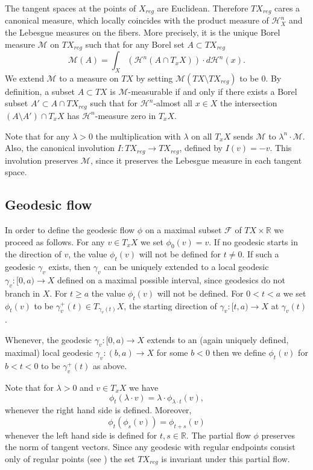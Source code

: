 \documentclass[12pt,leqno,intlimits]{amsart}
\numberwithin{equation}{section}
\theoremstyle{definition}
\theoremstyle{remark}
\newcommand{\R}{\mathbb{R}}
\def\:{\colon}
\begin{document}
The tangent spaces at the points of $X_{reg}$ are Euclidean.
Therefore $TX_{reg}$ cares a canonical measure, which locally coincides with the product measure of $\mathcal H^n _X$ and the Lebesgue measures on the fibers. 
More precisely, it is the unique Borel measure $\mathcal M$ on $TX_{reg}$ such that for any  Borel set $A\subset TX_{reg}$
$$\mathcal M(A)= \int _X (\mathcal H^n(A \cap T_x X))\cdot d\mathcal H^n (x).$$
 We extend $\mathcal M$ to a measure on $TX$ by setting $\mathcal M(TX\setminus TX_{reg})$ to be $0$.
By definition, a subset $A\subset TX$ is $\mathcal M$-measurable if and only if there exists  a Borel subset $A'\subset A\cap TX_{reg}$ such that
for $\mathcal H^n$-almost all $x\in X$ the intersection $(A\setminus A') \cap T_xX$ has $\mathcal H^n$-measure zero in $T_xX$.

Note that for any $\lambda >0$ the multiplication with $\lambda$  on all $T_xX$ sends $\mathcal M $ to $\lambda ^n \cdot \mathcal M$.
Also, the canonical involution $I\:TX_{reg}\to TX_{reg}$, defined by $I(v)=-v$.
This involution preserves $\mathcal M$, since it preserves the Lebesgue measure in each tangent space.


\subsection{Geodesic flow}
In order to define the geodesic flow $\phi$ on a maximal subset   $\mathcal F$ of $TX \times \R $  we proceed as follows.
For any  $v\in  T_xX$ we set $\phi_0(v)=v$.
If no geodesic starts in the direction of $v$, the value $\phi_t(v)$ will not be defined for $t\neq 0$. If such a geodesic $\gamma_v$ exists, then $\gamma_v$   can be uniquely extended to a  local geodesic $\gamma_v \:[0,a)\to X$  defined on a maximal possible interval, since  geodesics do not branch in $X$.  For $t\geq a$
 the value $\phi_t(v)$ will not be defined. For $0<t<a$ we set $\phi_t(v)$ to be $\gamma _v ^+ (t) \in T_{\gamma _v(t)} X$, the starting direction of $\gamma_v\:[t,a) \to X$ at $\gamma_v (t)$.

Whenever, the geodesic $\gamma _v\:[0,a)\to X$ extends to an (again uniquely defined, maximal)  local geodesic   $\gamma_v\:(b,a) \to X$ for some $b<0$ then we define $\phi_t(v)$ for $b<t<0$ to be $\gamma_v ^+ (t) $ as above.


Note that for $\lambda >0$ and $v\in  T_x X$ we have 
\[\phi_t(\lambda\cdot  v) =\lambda \cdot \phi_{\lambda\cdot t}(v),\] 
whenever the right hand side is defined. 
Moreover, 
\[\phi _t ( \phi _s (v))= \phi _{t+s} (v)\] 
whenever the left hand side is defined for $t,s\in \R$.
The partial flow $\phi$ preserves the norm of tangent vectors. 
Since any geodesic with regular endpoints consist only of regular points (see  \cite{Petparallel})
the set  $TX_{reg}$ is invariant under this partial flow.
\end{document}
